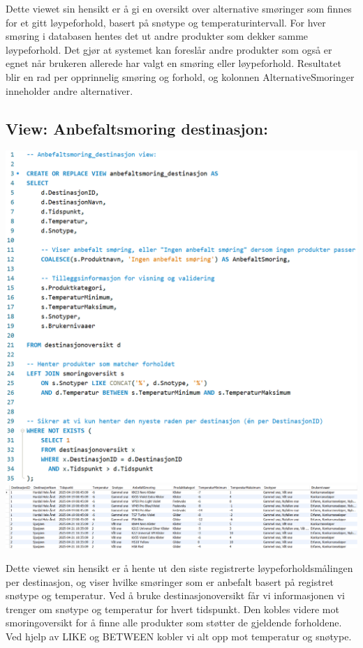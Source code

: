 \documentclass[10pt, a4paper]{article}
\begin{document}
Dette viewet sin hensikt er å gi en oversikt over alternative smøringer som finnes for et gitt løypeforhold, basert på snøtype og temperaturintervall. For hver smøring i databasen hentes det ut andre produkter som dekker samme løypeforhold. Det gjør at systemet kan foreslår andre produkter som også er egnet når brukeren allerede har valgt en smøring eller løypeforhold. Resultatet blir en rad per opprinnelig smøring og forhold, og kolonnen AlternativeSmoringer inneholder andre alternativer.

\subsection{View: Anbefaltsmoring destinasjon:}

\includegraphics[width=\textwidth]{anbefaltsmoring_destinasjon.png}
\includegraphics[width=\textwidth]{anbefaltsmoring_destinasjon_resultat.png}

Dette viewet sin hensikt er å hente ut den siste registrerte løypeforholdsmålingen per destinasjon, og viser hvilke smøringer som er anbefalt basert på registret snøtype og temperatur. Ved å bruke destinasjonoversikt får vi informasjonen vi trenger om snøtype og temperatur for hvert tidspunkt. Den kobles videre mot smoringoversikt for å finne alle produkter som støtter de gjeldende forholdene. Ved hjelp av LIKE og BETWEEN kobler vi alt opp mot temperatur og snøtype.
\end{document}
